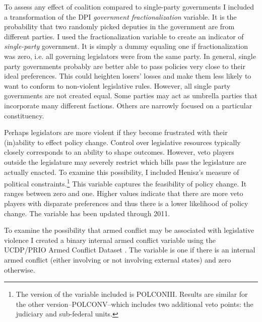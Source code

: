 \documentclass[a4paper]{article}\usepackage[]{graphicx}\usepackage[]{color}
\begin{document}
To assess any effect of coalition compared to single-party governments I included a transformation of the DPI {\emph{government fractionalization}} variable. It is the probability that two randomly picked deputies in the government are from different parties. I used the fractionalization variable to create an indicator of {\emph{single-party}} government. It is simply a dummy equaling one if fractionalization was zero, i.e. all governing legislators were from the same party. In general, single party governments probably are better able to pass policies very close to their ideal preferences. This could heighten losers' losses and make them less likely to want to conform to non-violent legislative rules. However, all single party governments are not created equal. Some parties may act as umbrella parties that incorporate many different factions. Others are narrowly focused on a particular constituency.

Perhaps legislators are more violent if they become frustrated with their (in)ability to effect policy change. Control over legislative resources typically closely corresponds to an ability to shape outcomes. However, veto players outside the legislature may severely restrict which bills pass the legislature are actually enacted. To examine this possibility, I included Henisz's \citeyearpar{Henisz2004} measure of political constraints.\footnote{The version of the variable included is POLCONIII. Results are similar for the other version--POLCONV--which includes two additional veto points: the judiciary and sub-federal units.} This variable captures the feasibility of policy change. It ranges between zero and one. Higher values indicate that there are more veto players with disparate preferences and thus there is a lower likelihood of policy change. The variable has been updated through 2011.

To examine the possibility that armed conflict may be associated with legislative violence I created a binary internal armed conflict variable using the UCDP/PRIO Armed Conflict Dataset \citep{Themner2014}. The variable is one if there is an internal armed conflict (either involving or not involving external states) and zero otherwise.
\end{document}
